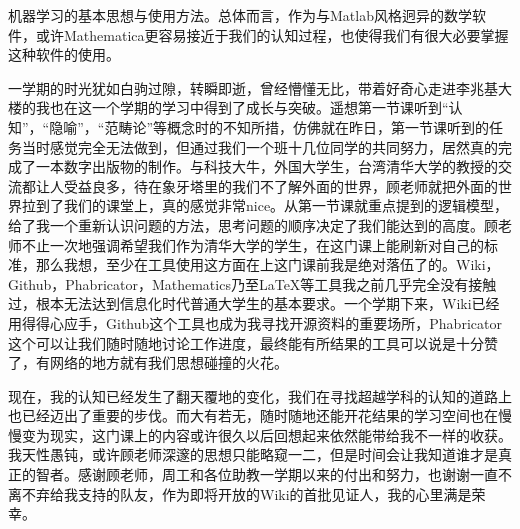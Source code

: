 \documentclass[11pt,fleqn]{book}
\numberwithin{dummy}{section}
\theoremstyle{ocrenumbox}
\theoremstyle{blacknumex}
\theoremstyle{blacknumbox}
\theoremstyle{ocrenum}
\newenvironment{remark}[1]{\par\vspace{10pt}\small %
	\begin{list}{}{
			\leftmargin=35pt %
			\rightmargin=25pt}\item\ignorespaces %
		\makebox[-2.5pt]{\begin{tikzpicture}[overlay]
			\node[draw=ocre!60,line width=1pt,circle,fill=ocre!25,font=\sffamily\bfseries,inner sep=2pt,outer sep=0pt] at (-15pt,0pt){\textcolor{ocre}{#1}};\end{tikzpicture}} %
		\advance\baselineskip -1pt}{\end{list}\vskip5pt} %
\newlength\esp
\begin{document}
\begin{remark}{费}
机器学习的基本思想与使用方法。总体而言，作为与Matlab风格迥异的数学软件，或许Mathematica更容易接近于我们的认知过程，也使得我们有很大必要掌握这种软件的使用。
\end{remark}

\begin{remark}{张}
     一学期的时光犹如白驹过隙，转瞬即逝，曾经懵懂无比，带着好奇心走进李兆基大楼的我也在这一个学期的学习中得到了成长与突破。遥想第一节课听到“认知”，“隐喻”，“范畴论”等概念时的不知所措，仿佛就在昨日，第一节课听到的任务当时感觉完全无法做到，但通过我们一个班十几位同学的共同努力，居然真的完成了一本数字出版物的制作。与科技大牛，外国大学生，台湾清华大学的教授的交流都让人受益良多，待在象牙塔里的我们不了解外面的世界，顾老师就把外面的世界拉到了我们的课堂上，真的感觉非常nice。从第一节课就重点提到的逻辑模型，给了我一个重新认识问题的方法，思考问题的顺序决定了我们能达到的高度。顾老师不止一次地强调希望我们作为清华大学的学生，在这门课上能刷新对自己的标准，那么我想，至少在工具使用这方面在上这门课前我是绝对落伍了的。Wiki，Github，Phabricator，Mathematics乃至LaTeX等工具我之前几乎完全没有接触过，根本无法达到信息化时代普通大学生的基本要求。一个学期下来，Wiki已经用得得心应手，Github这个工具也成为我寻找开源资料的重要场所，Phabricator这个可以让我们随时随地讨论工作进度，最终能有所结果的工具可以说是十分赞了，有网络的地方就有我们思想碰撞的火花。

     现在，我的认知已经发生了翻天覆地的变化，我们在寻找超越学科的认知的道路上也已经迈出了重要的步伐。而大有若无，随时随地还能开花结果的学习空间也在慢慢变为现实，这门课上的内容或许很久以后回想起来依然能带给我不一样的收获。我天性愚钝，或许顾老师深邃的思想只能略窥一二，但是时间会让我知道谁才是真正的智者。感谢顾老师，周工和各位助教一学期以来的付出和努力，也谢谢一直不离不弃给我支持的队友，作为即将开放的Wiki的首批见证人，我的心里满是荣幸。
\end{remark}
\end{document}
